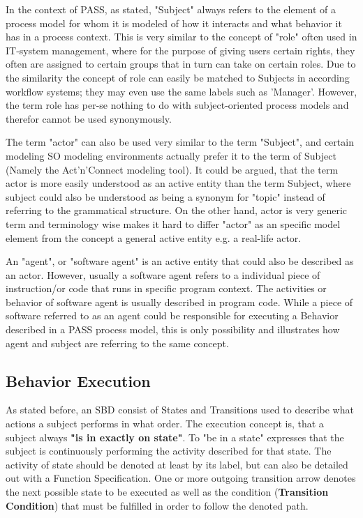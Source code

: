 In the context of PASS, as stated, "Subject" always refers to the element of a process model for whom it is modeled of how it interacts and what behavior it has in a process context. This is very similar to the concept of "role" often used in IT-system management, where for the purpose of giving users certain rights, they often are assigned to certain groups that in turn can take on certain roles. Due to the similarity the concept of role can easily be matched to Subjects in according workflow systems; they may even use the same labels such as 'Manager'. However, the term role has per-se nothing to do with subject-oriented process models and therefor cannot be used synonymously.

The term "actor" can also be used very similar to the term "Subject", and certain modeling SO modeling environments actually prefer it to the term of Subject (Namely the Act'n'Connect modeling tool). It could be argued, that the term actor is more easily understood as an active entity than the term Subject, where subject could also be understood as being a synonym for "topic" instead of referring to the grammatical structure. On the other hand, actor is very generic term and terminology wise makes it hard to differ "actor" as an specific model element from the concept a general active entity e.g. a real-life actor.

An "agent", or "software agent" is an active entity that could also be described as an actor. However, usually a software agent refers to a individual piece of instruction/or code that runs in specific program context. The activities or behavior of software agent is usually described in program code. While a piece of software referred to as an agent could be responsible for executing a Behavior described in a PASS process model, this is only possibility and illustrates how agent and subject are referring to the same concept.

\subsection{Behavior Execution}

As stated before, an SBD consist of States and Transitions used to describe what actions a subject performs in what order. The execution concept is, that a subject always \textbf{"is in exactly on state"}.  To "be in a state" expresses that the subject is continuously performing the activity described for that state. The activity of state should be denoted at least by its label, but can also be detailed out with a Function Specification. One or more outgoing transition arrow denotes the next possible state to be executed as well as the condition (\textbf{Transition Condition}) that must be fulfilled in order to  follow the denoted path.  



